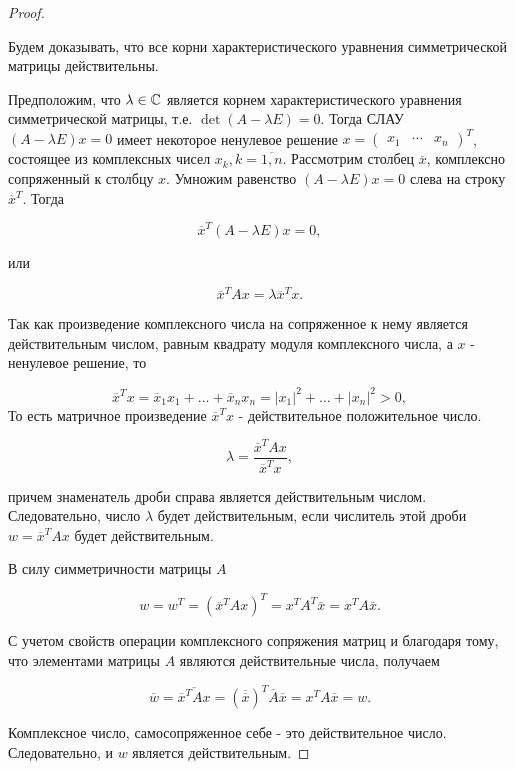 \begin{proof}~

    Будем доказывать, что все корни характеристического уравнения симметрической матрицы действительны.

    Предположим, что $\lambda \in \mathbb{C}$ является корнем характеристического уравнения симметрической матрицы, т.е. $\det (A - \lambda E) = 0$. Тогда СЛАУ $(A - \lambda E)x = 0$ имеет некоторое ненулевое решение $x = \begin{pmatrix} x_1 & \cdots & x_n \end{pmatrix} ^ T$, состоящее из комплексных чисел $x_k, k = \overline{1, n}$. Рассмотрим столбец $\overline{x}$, комплексно сопряженный к столбцу $x$. Умножим равенство $(A - \lambda E)x = 0$ слева на строку $\overline{x}^T$. Тогда

    $$\overline{x}^T(A - \lambda E)x = 0,$$

    или

    $$\overline{x}^TAx = \lambda \overline{x}^Tx.$$

    Так как произведение комплексного числа на сопряженное к нему является действительным числом, равным квадрату модуля комплексного числа, а $x$ - ненулевое решение, то
    
    $$\overline{x}^Tx = \overline{x}_1x_1 + \ldots + \overline{x}_nx_n = |x_1|^2 + \ldots + |x_n|^2 > 0,$$
    То есть матричное произведение $\overline{x}^Tx$ - действительное положительное число.

    $$\lambda = \frac{\overline{x}^TAx}{\overline{x}^Tx},$$

    причем знаменатель дроби справа является действительным числом. Следовательно, число $\lambda$ будет действительным, если числитель этой дроби $w = \overline{x}^TAx$ будет действительным.

    В силу симметричности матрицы $A$

    $$w = w^T = (\overline{x}^TAx)^T = x^TA^T\overline{x} = x^TA\overline{x}.$$

    С учетом свойств операции комплексного сопряжения матриц и благодаря тому, что элементами матрицы $A$ являются действительные числа, получаем

    $$\overline{w} = \overline{\overline{x}^TAx} = (\overline{\overline{x}})^T\overline{A}\overline{x} = x^TA\overline{x} = w.$$

    Комплексное число, самосопряженное себе - это действительное число. Следовательно, и $w$ является действительным.
\end{proof}
